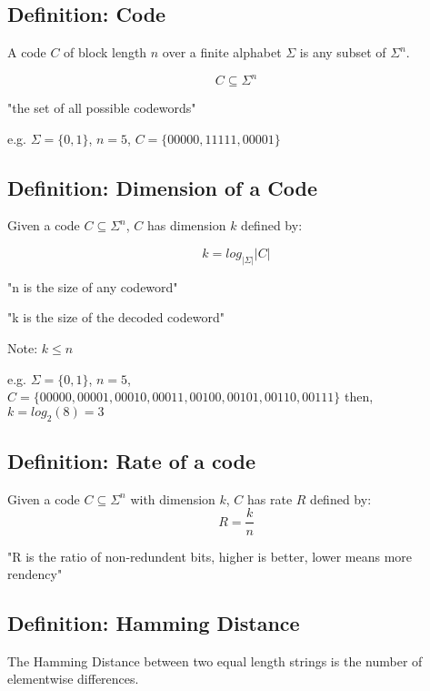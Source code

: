 \documentclass[12pt]{article}
\begin{document}
\section{}

\subsection{Definition: Code}
A code $C$ of block length $n$ over a finite alphabet $\Sigma$ is any subset of $\Sigma^n$.

$$ C \subseteq \Sigma^n$$

\begin{center}
  "the set of all possible codewords"
\end{center}

e.g. $\Sigma = \{0,1\}$, $n=5$, $C = \{00000, 11111, 00001\}$

\subsection{Definition: Dimension of a Code}
Given a code $C \subseteq \Sigma^n$, $C$ has dimension $k$ defined by:

$$ k = log_{\lvert \Sigma \rvert} \lvert C \rvert $$

\begin{center}
  "n is the size of any codeword"
\end{center}
\begin{center}
  "k is the size of the decoded codeword"
\end{center}

Note: $k \leq n$

e.g. $\Sigma = \{0,1\}$, $n=5$, $C = \{00000, 00001, 00010, 00011, 00100, 00101, 00110, 00111\}$ then, $ k = log_2 (8) = 3$

\subsection{Definition: Rate of a code}
Given a code $C \subseteq \Sigma^n$ with dimension $k$, $C$ has rate $R$ defined by:
$$ R = \frac{k}{n}$$

\begin{center}
  "R is the ratio of non-redundent bits, higher is better, lower means more rendency"
\end{center}


\subsection{Definition: Hamming Distance}
The Hamming Distance between two equal length strings is the number of elementwise differences.
\end{document}
